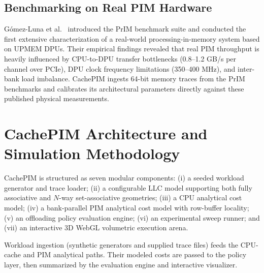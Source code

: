 \documentclass[journal,10pt,twocolumn]{IEEEtran}
\begin{document}
\subsection{Benchmarking on Real PIM Hardware}
G{\'o}mez-Luna et al.~\cite{GomezLuna2022} introduced the PrIM benchmark suite and conducted the first extensive characterization of a real-world processing-in-memory system based on UPMEM DPUs. Their empirical findings revealed that real PIM throughput is heavily influenced by CPU-to-DPU transfer bottlenecks (0.8--1.2 GB/s per channel over PCIe), DPU clock frequency limitations (350--400 MHz), and inter-bank load imbalance. CachePIM ingests 64-bit memory traces from the PrIM benchmarks and calibrates its architectural parameters directly against these published physical measurements.

\section{CachePIM Architecture and Simulation Methodology}
CachePIM is structured as seven modular components: (i) a seeded workload generator and trace loader; (ii) a configurable LLC model supporting both fully associative and $N$-way set-associative geometries; (iii) a CPU analytical cost model; (iv) a bank-parallel PIM analytical cost model with row-buffer locality; (v) an offloading policy evaluation engine; (vi) an experimental sweep runner; and (vii) an interactive 3D WebGL volumetric execution arena.

Workload ingestion (synthetic generators and supplied trace files) feeds the CPU-cache and PIM analytical paths. Their modeled costs are passed to the policy layer, then summarized by the evaluation engine and interactive visualizer.
\end{document}
